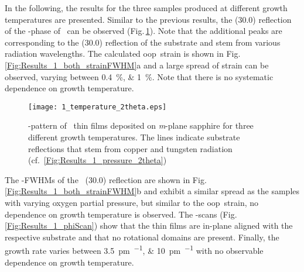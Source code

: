 In the following, the results for the three samples produced at different growth temperatures are presented.
Similar to the previous results, the (30.0) reflection of the \textalpha-phase of \cro\ can be observed (Fig.\,\ref{Fig:Results_1_temperature_2theta}).
Note that the additional peaks are corresponding to the (30.0) reflection of the substrate and stem from various radiation wavelengths.
The calculated \gls{oop}\ strain is shown in Fig.\,\ref{Fig:Results_1_both_strainFWHM}a and a large spread of strain can be observed, varying between \qtylist{0.4;1}{\percent}.
Note that there is no systematic dependence on growth temperature.
\begin{figure}
    \centering
    \texttt{[image: 1\_temperature\_2theta.eps]}
    \caption{
        \thetaomega-pattern of \cro\ thin films deposited on \textit{m}-plane sapphire for three different growth temperatures.
        The lines indicate substrate reflections that stem from copper and tungsten radiation (cf.~\ref{Fig:Results_1_pressure_2theta})
    }
    \label{Fig:Results_1_temperature_2theta}
\end{figure}
The \textomega-FWHMs of the \cro\ (30.0) reflection are shown in Fig.\,\ref{Fig:Results_1_both_strainFWHM}b and exhibit a similar spread as the samples with varying oxygen partial pressure, but similar to the \gls{oop}\ strain, no dependence on growth temperature is observed.
The \textphi-scans (Fig.\,\ref{Fig:Results_1_phiScan}) show that the thin films are in-plane aligned with the respective substrate and that no rotational domains are present.
Finally, the growth rate varies between \qtylist{3.5;10}{\pm\per\pulse} with no observable dependence on growth temperature.